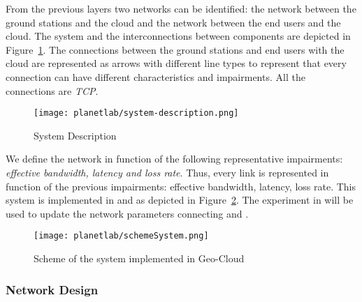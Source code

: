 From the previous layers two networks can be identified: the network between the
ground stations and the cloud and the network between the end users and the
cloud. The system and the interconnections between components are depicted in
Figure~\ref{fig:ple-system-description}. The connections between the ground stations and end users with the
cloud are represented as arrows with different line types to represent that
every connection can have different characteristics and impairments. All the
connections are \emph{TCP}.

\begin{figure}[!h]
\begin{center}
\texttt{[image: planetlab/system-description.png]}

\caption{System Description}
\label{fig:ple-system-description}
\end{center}
\end{figure}

We define the network in function of the following representative impairments: \emph{effective bandwidth, latency and loss rate}. Thus, every link is represented in function of the previous impairments: effective bandwidth, latency, loss rate.
This system is implemented in \vw and \bonfire as depicted in Figure~\ref{fig:ple-scheme-system}. The experiment in \pl will be used to update the
network parameters connecting \vw and \bonfire.

\begin{figure}[!h]
\begin{center}
\texttt{[image: planetlab/schemeSystem.png]}
\caption{Scheme of the system implemented in Geo-Cloud}
\label{fig:ple-scheme-system}
\end{center}
\end{figure}


\subsubsection{Network Design}

